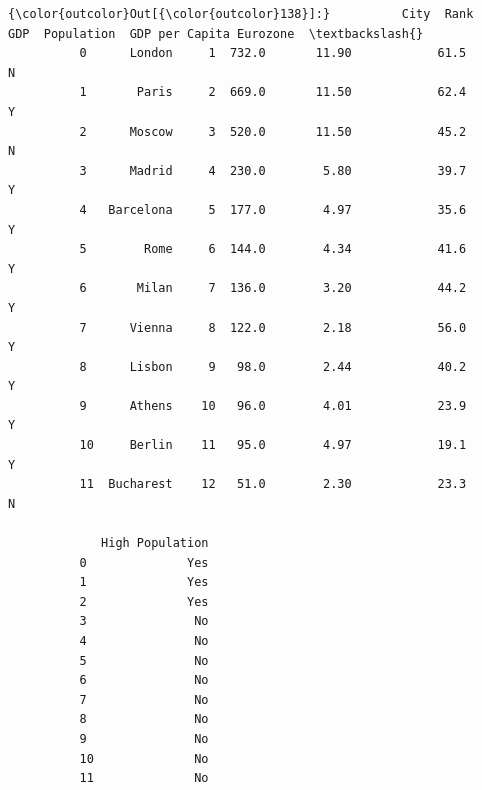 \documentclass[11pt]{article}
\begin{document}
\begin{Verbatim}[commandchars=\\\{\}]
{\color{outcolor}Out[{\color{outcolor}138}]:}          City  Rank    GDP  Population  GDP per Capita Eurozone  \textbackslash{}
          0      London     1  732.0       11.90            61.5        N   
          1       Paris     2  669.0       11.50            62.4        Y   
          2      Moscow     3  520.0       11.50            45.2        N   
          3      Madrid     4  230.0        5.80            39.7        Y   
          4   Barcelona     5  177.0        4.97            35.6        Y   
          5        Rome     6  144.0        4.34            41.6        Y   
          6       Milan     7  136.0        3.20            44.2        Y   
          7      Vienna     8  122.0        2.18            56.0        Y   
          8      Lisbon     9   98.0        2.44            40.2        Y   
          9      Athens    10   96.0        4.01            23.9        Y   
          10     Berlin    11   95.0        4.97            19.1        Y   
          11  Bucharest    12   51.0        2.30            23.3        N   
          
             High Population  
          0              Yes  
          1              Yes  
          2              Yes  
          3               No  
          4               No  
          5               No  
          6               No  
          7               No  
          8               No  
          9               No  
          10              No  
          11              No  
\end{Verbatim}
            
\end{document}
